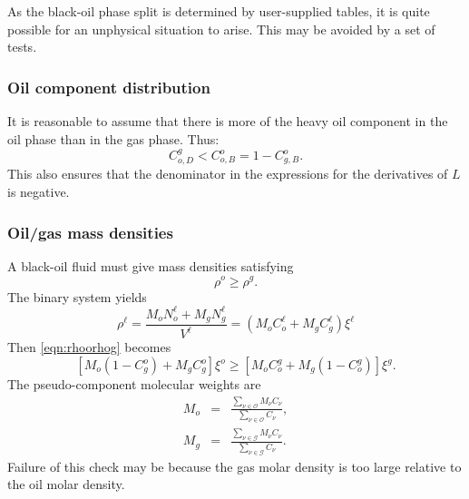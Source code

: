 

As the black-oil phase split is determined by user-supplied tables, it
is quite possible for an unphysical situation to arise. This may be
avoided by a set of tests.


\subsubsection{Oil component distribution}

It is reasonable to assume that there is more of the heavy oil
component in the oil phase than in the gas phase. Thus:
\begin{equation}
  C_{o,D}^g < C_{o,B}^o = 1 - C_{g,B}^o.
\end{equation}
This also ensures that the denominator in the expressions for the
derivatives of $L$ is negative.


\subsubsection{Oil/gas mass densities}

A black-oil fluid must give mass densities satisfying
\begin{equation}
  \label{eqn:rhoorhog}
  \rho^o \geq \rho^g.
\end{equation}
The binary system yields
\begin{equation}
  \rho^\ell = \frac{M_o N_o^\ell + M_g N_g^\ell}{V^\ell}
  = \left(M_o C_o^\ell + M_g C_g^\ell\right) \xi^\ell
\end{equation}
Then \eqref{eqn:rhoorhog} becomes
\begin{equation}
  \left[M_o \left(1-C_g^o\right) + M_g C_g^o\right] \xi^o \geq
  \left[M_o C_o^g + M_g \left(1-C_o^g\right)\right] \xi^g.
\end{equation}
The pseudo-component molecular weights are
\begin{eqnarray}
  M_o & = & \frac{\sum_{\nu\in\mathcal{O}} M_\nu C_\nu}{\sum_{\nu\in\mathcal{O}} C_\nu}, \\
  M_g & = & \frac{\sum_{\nu\in\mathcal{G}} M_\nu C_\nu}{\sum_{\nu\in\mathcal{G}} C_\nu}.
\end{eqnarray}
Failure of this check may be because the gas molar density is too
large relative to the oil molar density.

